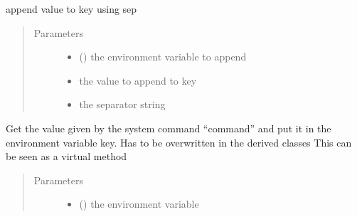 \documentclass[a4paper,10pt,english]{sphinxmanual}
\begin{document}
\begin{fulllineitems}

\begin{fulllineitems}
\label{\detokenize{commands/apidoc/src:src.fileEnviron.ContextFileEnviron.append_value}}
append value to key using sep
\begin{quote}\begin{description}
\item[{Parameters}] \leavevmode\begin{itemize}
\item {} 
 () \textendash{} the environment variable to append

\item {} 
 \textendash{} the value to append to key

\item {} 
 \textendash{} the separator string

\end{itemize}

\end{description}\end{quote}

\end{fulllineitems}


\begin{fulllineitems}
\label{\detokenize{commands/apidoc/src:src.fileEnviron.ContextFileEnviron.command_value}}
Get the value given by the system command “command” 
and put it in the environment variable key.
Has to be overwritten in the derived classes
This can be seen as a virtual method
\begin{quote}\begin{description}
\item[{Parameters}] \leavevmode\begin{itemize}
\item {} 
 () \textendash{} the environment variable


\end{itemize}
\end{description}
\end{quote}
\end{fulllineitems}
\end{fulllineitems}
\end{document}
